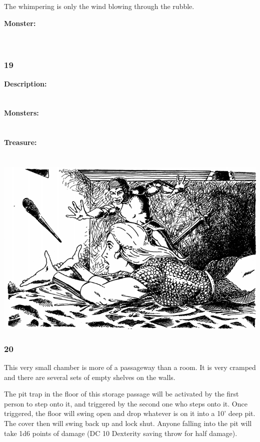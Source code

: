 \documentclass[palace_of_the_silver_princess]{subfiles}
\begin{document}
The whimpering is only the wind blowing through the rubble.

\textbf{Monster:}
\\
\\
\\

\subsubsection{19}
\textbf{Description:}
\\
\\
\\
\textbf{Monsters:}
\\
\\
\\
\textbf{Treasure:}
\\
\\
\\

\includegraphics[width=\columnwidth]{img/wand.png}

\subsubsection{20}
\begin{quotebox}
    This very small chamber is more of a passageway than a room. It is
    very cramped and there are several sets of empty shelves on the
    walls.
\end{quotebox}

The pit trap in the floor of this storage passage will be activated by
the first person to step onto it, and triggered by the second one who
steps onto it. Once triggered, the floor will swing open and drop
whatever is on it into a 10’ deep pit. The cover then will swing back up
and lock shut. Anyone falling into the pit will take 1d6 points of
damage (DC 10 Dexterity saving throw for half damage).
\end{document}
